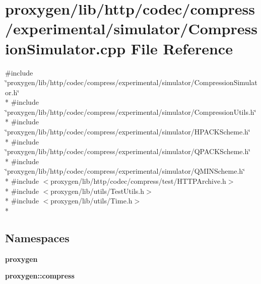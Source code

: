 \section{proxygen/lib/http/codec/compress/experimental/simulator/\+Compression\+Simulator.cpp File Reference}
\label{CompressionSimulator_8cpp}
{\ttfamily \#include \char`\"{}proxygen/lib/http/codec/compress/experimental/simulator/\+Compression\+Simulator.\+h\char`\"{}}\\*
{\ttfamily \#include \char`\"{}proxygen/lib/http/codec/compress/experimental/simulator/\+Compression\+Utils.\+h\char`\"{}}\\*
{\ttfamily \#include \char`\"{}proxygen/lib/http/codec/compress/experimental/simulator/\+H\+P\+A\+C\+K\+Scheme.\+h\char`\"{}}\\*
{\ttfamily \#include \char`\"{}proxygen/lib/http/codec/compress/experimental/simulator/\+Q\+P\+A\+C\+K\+Scheme.\+h\char`\"{}}\\*
{\ttfamily \#include \char`\"{}proxygen/lib/http/codec/compress/experimental/simulator/\+Q\+M\+I\+N\+Scheme.\+h\char`\"{}}\\*
{\ttfamily \#include $<$proxygen/lib/http/codec/compress/test/\+H\+T\+T\+P\+Archive.\+h$>$}\\*
{\ttfamily \#include $<$proxygen/lib/utils/\+Test\+Utils.\+h$>$}\\*
{\ttfamily \#include $<$proxygen/lib/utils/\+Time.\+h$>$}\\*
\subsection*{Namespaces}
\begin{DoxyCompactItemize}
\item 
 {\bf proxygen}
\item 
 {\bf proxygen\+::compress}
\end{DoxyCompactItemize}
